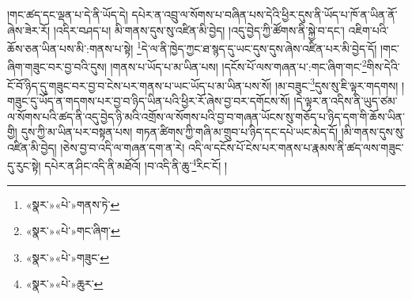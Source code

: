 །གང་ཚད་དང་ལྡན་པ་དེ་ནི་ཡོད་དེ། དཔེར་ན་འབྲུ་ལ་སོགས་པ་བཞིན་པས་དེའི་ཕྱིར་དུས་ནི་ཡོད་པ་ཁོ་ན་ཡིན་ནོ་ཞེས་ཟེར་རོ། །འདིར་བཤད་པ། མི་གནས་དུས་སུ་འཛིན་མི་བྱེད། །འདུ་བྱེད་ཀྱི་ཚོགས་ནི་སྐྱེ་བ་དང་། འཇིག་པའི་ཆོས་ཅན་ཡིན་པས་མི་:གནས་པ་སྟེ། \footnote{«སྣར་»«པེ་»གནས་ཏེ་}དེ་ལ་ནི་ཁྱེད་ཀྱང་ཐ་སྙད་དུ་ཡང་དུས་དུས་ཞེས་འཛིན་པར་མི་བྱེད་དོ། །གང་ཞིག་གཟུང་བར་བྱ་བའི་དུས། །གནས་པ་ཡོད་པ་མ་ཡིན་པས། །དངོས་པོ་ལས་གཞན་པ་:གང་ཞིག་གང་\footnote{«སྣར་»«པེ་»གང་ཞིག་}གིས་དེའི་ངོ་བོ་ཉིད་དུ་གཟུང་བར་བྱ་བ་ངེས་པར་གནས་པ་ཡང་ཡོད་པ་མ་ཡིན་པས་སོ། །མ་བཟུང་\footnote{«སྣར་»«པེ་»གཟུང་}དུས་སུ་ཇི་ལྟར་གདགས། །གཟུང་དུ་ཡོད་ན་གདགས་པར་བྱ་བ་ཉིད་ཡིན་པའི་ཕྱིར་རོ་ཞེས་བྱ་བར་དགོངས་སོ། །དེ་ལྟར་ན་འདིས་ནི་ཡུད་ཙམ་ལ་སོགས་པའི་ཚད་ནི་འདུ་བྱེད་ཉི་མའི་འགྲོས་ལ་སོགས་པའི་བྱ་བ་གཞན་ཡོངས་སུ་གཅོད་པ་ཉིད་དག་གི་ཆོས་ཡིན་གྱི། དུས་ཀྱི་མ་ཡིན་པར་བསྟན་པས། གཏན་ཚིགས་ཀྱི་གཞི་མ་གྲུབ་པ་ཉིད་དང་དཔེ་ཡང་མེད་དོ། །མི་གནས་དུས་སུ་འཛིན་མི་བྱེད། །ཅེས་བྱ་བ་འདི་ལ་གཞན་དག་ན་རེ། འདི་ལ་དངོས་པོ་ངེས་པར་གནས་པ་རྣམས་ནི་ཚད་ལས་གཟུང་དུ་རུང་སྟེ། དཔེར་ན་ཤིང་འདི་ནི་མཐོའོ། །བ་འདི་ནི་ཆུ་\footnote{«སྣར་»«པེ་»ཆུར་}རིང་ངོ། །
